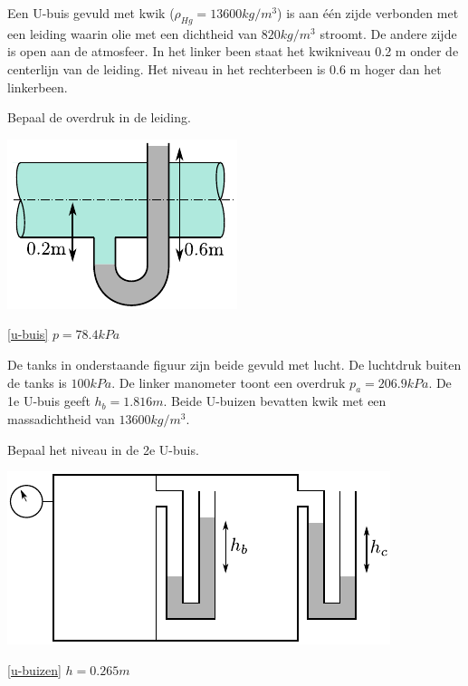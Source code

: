 \begin{toepassing}
	\label{u-buis}
Een U-buis gevuld met kwik ($\rho_{Hg}=13600\unit{kg/m^3}$) is aan één zijde verbonden met een leiding waarin olie met een dichtheid van $820\unit{kg/m^3}$ stroomt. De andere zijde is open aan de atmosfeer. In het linker been staat het kwikniveau 0.2 m onder de centerlijn van de leiding. Het niveau in het rechterbeen is 0.6 m hoger dan het linkerbeen.
		
Bepaal de overdruk in de leiding.

	\centering
	\includegraphics{fig/hydrostatica/u-buis}
\end{toepassing}
\begin{antwoord}{\ref{u-buis}}
	$p = 78.4\unit{kPa}$
\end{antwoord}
\begin{toepassing}
	\label{u-buizen}
De tanks in onderstaande figuur zijn beide gevuld met lucht. De luchtdruk buiten de tanks is $100\unit{kPa}$. De linker manometer toont een overdruk $p_a=206.9\unit{kPa}$. De 1e U-buis geeft $h_b=1.816\unit{m}$. Beide U-buizen bevatten kwik met een massadichtheid van $13600\unit{kg/m^3}$.
		
Bepaal het niveau in de 2e U-buis.

	\centering
	\includegraphics{fig/hydrostatica/u-buizen}
\end{toepassing}
\begin{antwoord}{\ref{u-buizen}}
	$h = 0.265\unit{m}$
\end{antwoord}
